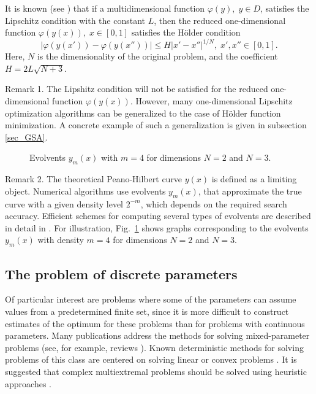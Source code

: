 \documentclass[preprint,12pt]{elsarticle}
\begin{document}
It is known (see \cite{Strongin2000}) that if a multidimensional function  $\varphi(y), \; y \in D$,  satisfies the Lipschitz condition with the constant $L$, then the reduced one-dimensional function $\varphi(y(x)), \; x \in [0,1]$ satisfies the H{\"o}lder condition
\begin{equation}\label{holder}
\left|\varphi(y(x'))-\varphi(y(x''))\right|\leq H\left|x'-x''\right|^{1/N}, \; x',x''\in[0,1].
\end{equation}
Here, $N$ is the dimensionality of the original problem, and the coefficient
$ H=2 L \sqrt{N+3}$.

Remark 1.  The Lipshitz condition will not be satisfied for the reduced one-dimensional function $\varphi(y(x))$. However, many one-dimensional Lipschitz optimization algorithms can be generalized to the case of H{\"o}lder function minimization. A concrete example of such a generalization is given in subsection \ref{sec_GSA}.

\begin{figure}
\center
\begin{minipage}{0.45\linewidth}
\end{minipage}
\begin{minipage}{0.45\linewidth}
\end{minipage}
\caption{Evolvents $y_m(x)$ with $m=4$ for dimensions $N=2$ and $N=3$.}\label{fig:Peano}
\end{figure}   

Remark 2. The theoretical Peano-Hilbert curve $y(x)$ is defined as a limiting object. Numerical algorithms use evolvents $y_m(x)$, that approximate the true curve with a given density level $2^{-m}$, which depends on the required search accuracy. Efficient schemes for computing several types of evolvents are described in detail in \cite{Sergeyev2013}. For illustration, Fig.~\ref{fig:Peano} shows graphs corresponding to the evolvents $y_m(x)$ with density $m=4$ for dimensions $N=2$ and $N=3$.

\subsection{The problem of discrete parameters}
\label{sec_discr} 

Of particular interest are problems where some of the parameters can assume values from a predetermined finite set, since it is more difficult to construct estimates of the optimum for these problems than for problems with continuous parameters. Many publications address the methods for solving mixed-parameter problems (see, for example, reviews \cite{Burer2012,Boukouvala2016}). Known deterministic methods for solving problems of this class are centered on solving linear or convex problems \cite{Lee2012}. It is suggested that complex multiextremal problems should be solved using heuristic approaches \cite{Belotti2013}. 
\end{document}
